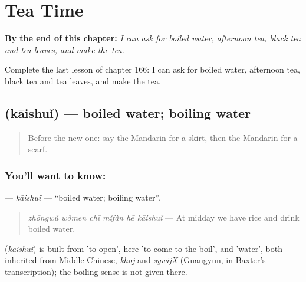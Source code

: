 
\chapter{Tea Time}
\label{ch:zh-tea-time}

\begin{chapteropening}
\textbf{By the end of this chapter:} \emph{I can ask for boiled water, afternoon tea, black tea and tea leaves, and make the tea.}

Complete the last lesson of chapter 166: I can ask for boiled water, afternoon tea, black tea and tea leaves, and make the tea.
\end{chapteropening}

\section[\texorpdfstring{\zh{开水} (kāishuǐ)}{开水 (kāishuǐ)}]{ (kāishuǐ) — boiled water; boiling water}

\label{lesson:ZH-C166-kaishui}



\begin{quote}
Before the new one: say the Mandarin for a skirt, then the Mandarin for a scarf.
\end{quote}

\subsection*{You'll want to know: }
\textbf{} — \emph{kāishuǐ} — \textquotedblleft{}boiled water; boiling water\textquotedblright{}.

\begin{quote}
\textbf{} \emph{zhōngwǔ wǒmen chī mǐfàn hē kāishuǐ} — At midday we have rice and drink boiled water.
\end{quote}

\begin{cousinweb}
\textbf{} (\emph{kāishuǐ}) is built from  'to open', here 'to come to the boil', and  'water', both inherited from Middle Chinese, \emph{khoj} and \emph{sywijX} (Guangyun, in Baxter's transcription); the boiling sense is not given there.
\end{cousinweb}

